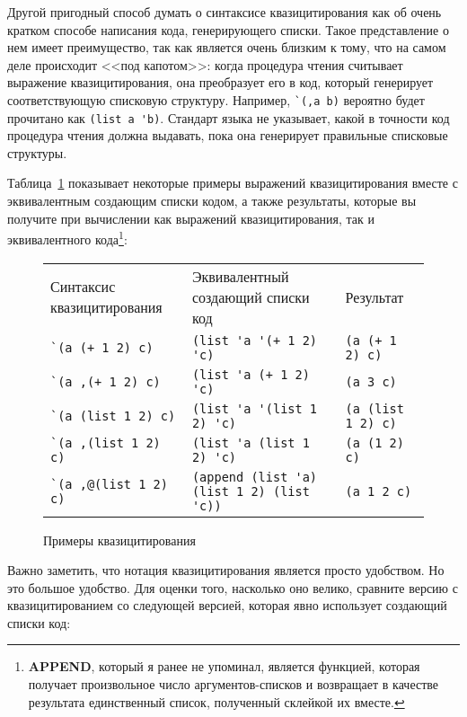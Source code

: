 Другой пригодный способ думать о синтаксисе квазицитирования как об очень кратком способе
написания кода, генерирующего списки. Такое представление о нем имеет преимущество, так
как является очень близким к тому, что на самом деле происходит <<под капотом>>: когда
процедура чтения считывает выражение квазицитирования, она преобразует его в код, который
генерирует соответствующую списковую структуру. Например, \lstinline!`(,a b)! вероятно
будет прочитано как \lstinline!(list a 'b)!. Стандарт языка не указывает, какой в точности
код процедура чтения должна выдавать, пока она генерирует правильные списковые структуры.

Таблица~\ref{table:08-1} показывает некоторые примеры выражений квазицитирования вместе с
эквивалентным создающим списки кодом, а также результаты, которые вы получите при
вычислении как выражений квазицитирования, так и эквивалентного
кода\footnote{\textbf{APPEND}, который я ранее не упоминал, является функцией, которая
  получает произвольное число аргументов-списков и возвращает в качестве результата
  единственный список, полученный склейкой их вместе.}:

\begin{figure}[tb]
\begin{tabular}{|>{\centering}m{25mm}|>{\centering}m{25mm}|>{\centering}m{25mm}|}
Синтаксис квазицитирования & Эквивалентный создающий списки код & Результат \\
\lstinline!`(a (+ 1 2) c)! & \lstinline!(list 'a '(+ 1 2) 'c)! & \lstinline!(a (+ 1 2) c)! \\
\lstinline!`(a ,(+ 1 2) c)! & \lstinline!(list 'a (+ 1 2) 'c)! & \lstinline!(a 3 c)! \\
\lstinline!`(a (list 1 2) c)! & \lstinline!(list 'a '(list 1 2) 'c)! & \lstinline!(a (list 1 2) c)! \\
\lstinline!`(a ,(list 1 2) c)! & \lstinline!(list 'a (list 1 2) 'c)! & \lstinline!(a (1 2) c)! \\
\lstinline!`(a ,@(list 1 2) c)! & \lstinline!(append (list 'a) (list 1 2) (list 'c))! & \lstinline!(a 1 2 c)! 
\end{tabular}
  \caption{Примеры квазицитирования} 
  \label{table:08-1}
\end{figure}

Важно заметить, что нотация квазицитирования является просто удобством. Но это большое
удобство. Для оценки того, насколько оно велико, сравните версию  с
квазицитированием со следующей версией, которая явно использует создающий списки код:

